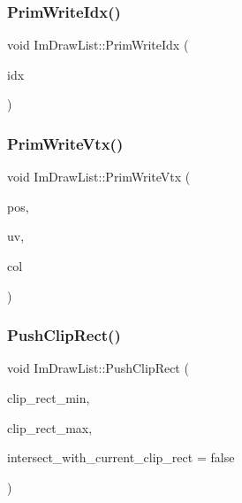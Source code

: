 \subsubsection{\texorpdfstring{Prim\+Write\+Idx()}{PrimWriteIdx()}}
{\footnotesize\ttfamily void Im\+Draw\+List\+::\+Prim\+Write\+Idx (\begin{DoxyParamCaption}\item[{\mbox{\hyperlink{imgui_8h_afdc8744a5ac1a968b1ddfa47e13b2fa1}{Im\+Draw\+Idx}}}]{idx }\end{DoxyParamCaption})\hspace{0.3cm}{\ttfamily [inline]}}

\mbox{\label{struct_im_draw_list_af86de4faf6c8e978fb712ea14c5d0c5f}} 
\subsubsection{\texorpdfstring{Prim\+Write\+Vtx()}{PrimWriteVtx()}}
{\footnotesize\ttfamily void Im\+Draw\+List\+::\+Prim\+Write\+Vtx (\begin{DoxyParamCaption}\item[{const \mbox{\hyperlink{struct_im_vec2}{Im\+Vec2}} \&}]{pos,  }\item[{const \mbox{\hyperlink{struct_im_vec2}{Im\+Vec2}} \&}]{uv,  }\item[{\mbox{\hyperlink{imgui_8h_a118cff4eeb8d00e7d07ce3d6460eed36}{Im\+U32}}}]{col }\end{DoxyParamCaption})\hspace{0.3cm}{\ttfamily [inline]}}

\mbox{\label{struct_im_draw_list_acb34e2d3708616cae4567f3b4af06962}} 
\subsubsection{\texorpdfstring{Push\+Clip\+Rect()}{PushClipRect()}}
{\footnotesize\ttfamily void Im\+Draw\+List\+::\+Push\+Clip\+Rect (\begin{DoxyParamCaption}\item[{\mbox{\hyperlink{struct_im_vec2}{Im\+Vec2}}}]{clip\+\_\+rect\+\_\+min,  }\item[{\mbox{\hyperlink{struct_im_vec2}{Im\+Vec2}}}]{clip\+\_\+rect\+\_\+max,  }\item[{bool}]{intersect\+\_\+with\+\_\+current\+\_\+clip\+\_\+rect = {\ttfamily false} }\end{DoxyParamCaption})}


